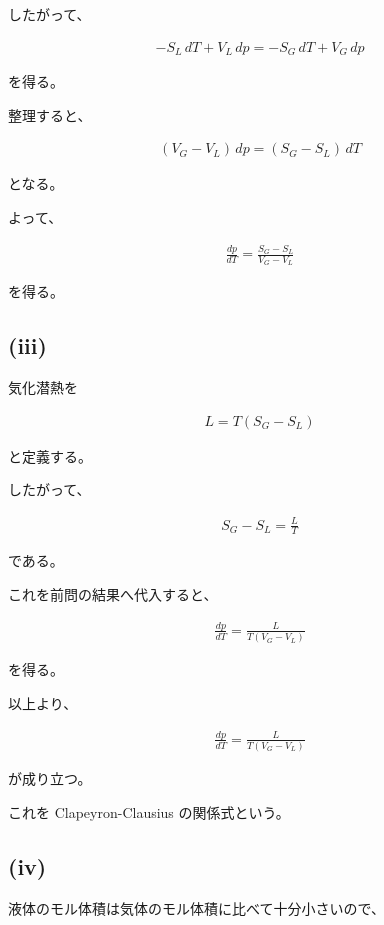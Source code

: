 \documentclass[platex,dvipdfmx,a4paper]{jsarticle}
\begin{document}
したがって、

\begin{align*}
-S_L\,dT+V_L\,dp
=
-S_G\,dT+V_G\,dp
\end{align*}

を得る。

整理すると、

\begin{align*}
(V_G-V_L)\,dp
=
(S_G-S_L)\,dT
\end{align*}

となる。

よって、

\begin{align*}
\frac{dp}{dT}
=
\frac{S_G-S_L}{V_G-V_L}
\end{align*}

を得る。

\subsection{(iii)}

気化潜熱を

\begin{align*}
L
=
T(S_G-S_L)
\end{align*}

と定義する。

したがって、

\begin{align*}
S_G-S_L
=
\frac{L}{T}
\end{align*}

である。

これを前問の結果へ代入すると、

\begin{align*}
\frac{dp}{dT}
=
\frac{L}
{T(V_G-V_L)}
\end{align*}

を得る。

以上より、

\begin{align*}
\frac{dp}{dT}
=
\frac{L}
{T(V_G-V_L)}
\end{align*}

が成り立つ。

これを Clapeyron-Clausius の関係式という。

\subsection{(iv)}

液体のモル体積は気体のモル体積に比べて十分小さいので、
\end{document}
